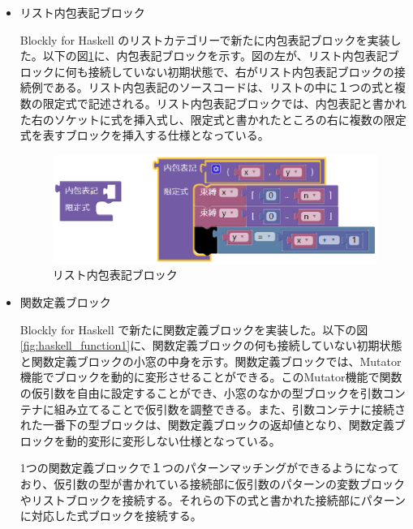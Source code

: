 \documentclass{eniepaper}
\begin{document}
\begin{itemize}
\item リスト内包表記ブロック

Blockly for Haskell のリストカテゴリーで新たに内包表記ブロックを実装した。以下の図\ref{fig:inner_table}に、内包表記ブロックを示す。図の左が、リスト内包表記ブロックに何も接続していない初期状態で、右がリスト内包表記ブロックの接続例である。リスト内包表記のソースコードは、リストの中に１つの式と複数の限定式で記述される。リスト内包表記ブロックでは、内包表記と書かれた右のソケットに式を挿入式し、限定式と書かれたところの右に複数の限定式を表すブロックを挿入する仕様となっている。


\begin{figure}[h]
\begin{center}
\includegraphics[scale=0.5]{img/inner_table.eps}
\caption{リスト内包表記ブロック}%
\label{fig:inner_table}
\end{center}%
\end{figure}%

\item 関数定義ブロック

Blockly for Haskell で新たに関数定義ブロックを実装した。以下の図\ref{fig:haskell_function1}に、関数定義ブロックの何も接続していない初期状態と関数定義ブロックの小窓の中身を示す。関数定義ブロックでは、Mutator機能でブロックを動的に変形させることができる。このMutator機能で関数の仮引数を自由に設定することができ、小窓のなかの型ブロックを引数コンテナに組み立てることで仮引数を調整できる。また、引数コンテナに接続された一番下の型ブロックは、関数定義ブロックの返却値となり、関数定義ブロックを動的変形に変形しない仕様となっている。

1つの関数定義ブロックで１つのパターンマッチングができるようになっており、仮引数の型が書かれている接続部に仮引数のパターンの変数ブロックやリストブロックを接続する。それらの下の式と書かれた接続部にパターンに対応した式ブロックを接続する。


\end{itemize}
\end{document}
